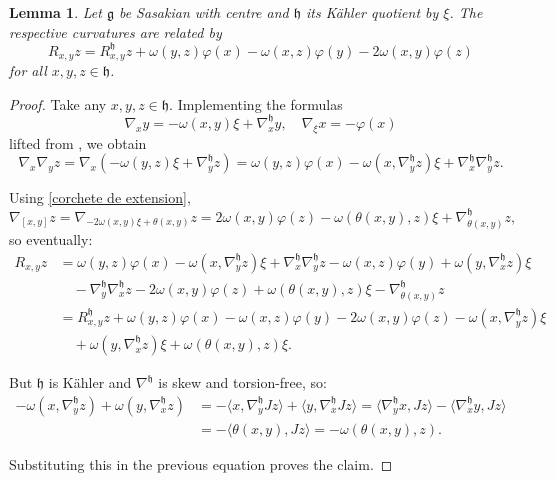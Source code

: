 \documentclass[12pt, twoside]{amsart}
\def\g{\mathfrak{g}}
\def\h{\mathfrak{h}}
\newtheorem{lemma}[definition]{Lemma}
\theoremstyle{definition}
\begin{document}
\begin{lemma}\label{Curvatura de g y h}
Let $\g$ be Sasakian with centre and $\h$ its K{\"a}hler quotient by $\xi$. The respective curvatures are  related by 
 \[R_{x,y}z=R^{\h}_{x,y}z+\omega(y, z)\varphi(x)-\omega(x,z)\varphi(y)-2\omega(x,y)\varphi(z)\]
    for all $x,y, z \in \h$. 
\end{lemma}

\begin{proof}
Take any $x,y, z \in \h$. Implementing the formulas 
   \begin{equation}\label{covariante en g y h}
      \nabla_{x}y=-\omega(x,y)\xi+ \nabla^{\h}_{x}y, \quad 
      \nabla_{\xi}x=-\varphi(x) 
   \end{equation}
lifted from \cite[Section 2]{to}, we obtain 
$$
    \nabla_{x}\nabla_{y}z=\nabla_{x}(-\omega(y, z)\xi + \nabla^{\h}_{y}z)=\omega(y, z)\varphi(x)-\omega(x,\nabla^{\h}_{y}z)\xi+\nabla^{\h}_{x}\nabla^{\h}_{y}z.
$$

Using \eqref{corchete de extension},  
$$
\nabla_{[x,y]}z=\nabla_{-2\omega(x,y)\xi+\theta(x,y)}z=2\omega(x,y)\varphi(z)-\omega(\theta(x,y),z)\xi+\nabla^{\h}_{\theta(x,y)}z,
$$
so eventually: 
\begin{equation*}\begin{split}
    R_{x,y}z &=\omega(y, z)\varphi(x)-\omega(x,\nabla^{\h}_{y}z)\xi+\nabla^{\h}_{x}\nabla^{\h}_{y}z - \omega(x,z)\varphi(y)+\omega(y,\nabla^{\h}_{x}z)\xi \\
    & \quad -\nabla^{\h}_{y}\nabla^{\h}_{x}z -2\omega(x,y)\varphi(z)+\omega(\theta(x,y),z)\xi-\nabla^{\h}_{\theta(x,y)}z\\
    &=R^{\h}_{x,y}z+\omega(y, z)\varphi(x)-\omega(x,z)\varphi(y)-2\omega(x,y)\varphi(z)-\omega(x,\nabla^{\h}_{y}z)\xi\\
    & \quad +\omega(y,\nabla^{\h}_{x}z)\xi+\omega(\theta(x,y),z)\xi.
\end{split}\end{equation*}

But $\h$ is K{\"a}hler and $\nabla^{\h}$ is skew and torsion-free, so:
\begin{equation*}\begin{split}
    -\omega(x, \nabla_{y}^{\h}z)+\omega(y,\nabla_{x}^{\h}z) & =
    -\langle x,\nabla _{y}^{\h}Jz\rangle+\langle y , \nabla^{\h}_{x}Jz\rangle = 
    \langle \nabla^{\h}_{y}x,Jz\rangle - \langle \nabla^{\h}_{x}y,Jz\rangle \\
    & = -\langle \theta(x,y),Jz\rangle = -\omega(\theta(x,y),z). 
\end{split}\end{equation*}

Substituting this in the previous equation proves the claim.
\end{proof}
\end{document}

